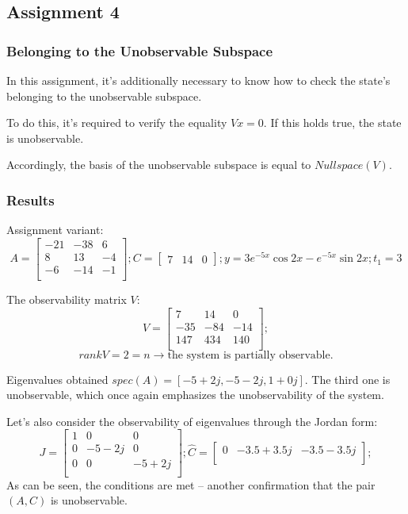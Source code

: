 \subsection{Assignment 4}
\subsubsection{Belonging to the Unobservable Subspace}
In this assignment, it's additionally necessary to know how to check the state's belonging to the unobservable subspace.

To do this, it's required to verify the equality \(Vx = 0\). If this holds true, the state is unobservable.

Accordingly, the basis of the unobservable subspace is equal to \(Nullspace(V)\).

\subsubsection{Results}
Assignment variant:
\[ A = \begin{bmatrix}
        -21 & -38 & 6 \\
        8 & 13 & -4 \\
        -6 & -14 & -1 \\
        \end{bmatrix}; 
        C = \begin{bmatrix}
                7 & 14 & 0
                \end{bmatrix}; 
        y = 3 e^{-5x}\cos{2x} - e^{-5x}\sin{2x}; 
        t_1 = 3
\]

The observability matrix \(V\):
\[ V = \begin{bmatrix}
        7 & 14 & 0 \\
        -35 & -84 & -14 \\
        147 & 434 & 140 \\
        \end{bmatrix};
\]
\[rankV = 2 = n \rightarrow \text{the system is partially observable.}\]

Eigenvalues obtained \(spec(A) = [-5+2j, -5 -2j, 1+0j]\). The third one is unobservable, which once again emphasizes the unobservability of the system.

Let's also consider the observability of eigenvalues through the Jordan form:
\[
        J = \begin{bmatrix}
                1 & 0 & 0 \\
                0 & -5 - 2j & 0 \\
                0 & 0 & -5 + 2j \\
                \end{bmatrix};
        \hat{C} = \begin{bmatrix}
                0 &
                -3.5 + 3.5j &
                -3.5 - 3.5j \\
                \end{bmatrix};
\]
As can be seen, the conditions are met -- another confirmation that the pair \((A, C)\) is unobservable.

